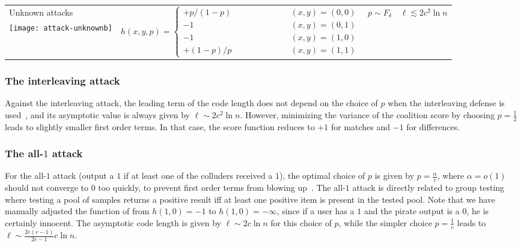 \documentclass[10pt,a4paper,twocolumn]{article}
\begin{document}
\begin{table*}[t]
\begin{small}
\begin{tabular}{p{2.8cm}p{8.2cm}p{2.2cm}p{3cm}}
		& & & \\
\midrule
    Unknown attacks & \multirow{4}{*}{$h(x,y,p) = \begin{cases} 
	+p/(1 - p) \qquad \qquad \qquad \ 	 		& (x,y) = (0,0) \\
	-1 											& (x,y) = (0,1) \\
	-1 											& (x,y) = (1,0) \\ 
	+(1 - p)/p									& (x,y) = (1,1) 
	\end{cases}$} &	\multirow{2}{*}{$p \sim F_{\delta}$} & \multirow{2}{*}{$\ell \lesssim 2 c^2 \ln n$} \\
	\multirow{3}{*}{\texttt{[image: attack-unknownb]}}	& & & \\ & & & \\
			& & & \\
    \bottomrule
    \end{tabular}
    \end{small}
\end{table*}

\subsubsection{The interleaving attack}
Against the interleaving attack, the leading term of the code length does not depend on the choice of $p$ when the interleaving defense is used~\cite[Proposition 10]{oosterwijk13}, and its asymptotic value is always given by $\ell \sim 2 c^2 \ln n$. However, minimizing the variance of the coalition score by choosing $p = \frac{1}{2}$ leads to slightly smaller first order terms. In that case, the score function reduces to $+1$ for matches and $-1$ for differences.

\subsubsection{The all-$1$ attack}
For the all-$1$ attack (output a $1$ if at least one of the colluders received a $1$), the optimal choice of $p$ is given by $p = \frac{\alpha}{c}$, where $\alpha = o(1)$ should not converge to $0$ too quickly, to prevent first order terms from blowing up~\cite{laarhoven13allerton}. The all-$1$ attack is directly related to group testing~\cite{laarhoven13allerton,meerwald11b} where testing a pool of samples returns a positive result iff at least one positive item is present in the tested pool. Note that we have manually adjusted the function of \cite{oosterwijk13} from $h(1,0) = -1$ to $h(1,0) = -\infty$, since if a user has a $1$ and the pirate output is a $0$, he is certainly innocent. The asymptotic code length is given by $\ell \sim 2 c \ln n$ for this choice of $p$, while the simpler choice $p = \frac{1}{c}$ leads to $\ell \sim \frac{2e(e - 1)}{2e-1}c \ln n$.
\end{document}
